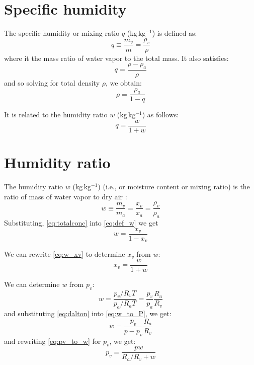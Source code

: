 \section*{Specific humidity}

The specific humidity or mixing ratio $q$ (kg\,kg$^{-1}$) is defined as:
\begin{equation}
q \equiv \frac{m_v}{m} = \frac{\rho_v}{\rho}
\label{eq:def_q}
\end{equation}
where it the mass ratio of water vapor to the total mass. It also satisfies:
\begin{equation}
q = \frac{\rho - \rho_a}{\rho}
\label{eq:q_rho}
\end{equation}
and so solving for total density $\rho$, we obtain:
\begin{equation}
\rho = \frac{\rho_a}{1-q}
\label{eq:q_rho2}
\end{equation}

It is related to the humidity ratio $w$ (kg\,kg$^{-1}$) as follows:
\begin{equation}
q = \frac{w}{1 + w}
\label{eq:q_w}
\end{equation}

\section*{Humidity ratio}

The humidity ratio $w$ (kg\,kg$^{-1}$) (i.e., or moisture content or mixing ratio) is the ratio of mass of water vapor to dry air \citep{ASHRAE2013}:
\begin{equation}
w \equiv \frac{m_v}{m_a} = \frac{x_v}{x_a} = \frac{\rho_v}{\rho_a}
\label{eq:def_w}
\end{equation}
Substituting, \cref{eq:totalconc} into \cref{eq:def_w} we get
\begin{equation}
w = \frac{x_v}{1 - x_v}
\label{eq:w_xv}
\end{equation}

We can rewrite \cref{eq:w_xv} to determine $x_v$ from $w$:
\begin{equation}
x_v = \frac{w}{1 + w}
\label{eq:xv_w}
\end{equation}

We can determine $w$ from $p_v$:
\begin{equation}
w = \frac{p_v/R_v T}{p_a/ R_aT} = \frac{p_v}{p_a}\frac{R_a}{R_v}
\label{eq:w_to_P}
\end{equation}
and substituting \cref{eq:dalton} into \cref{eq:w_to_P}, we get:
\begin{equation}
w = \frac{p_v}{p-p_v}\frac{R_a}{R_v}
\label{eq:pv_to_w}
\end{equation}
and rewriting \ref{eq:pv_to_w} for $p_v$, we get:
\begin{equation}
p_v = \frac{p w}{R_a/R_v+w}
\label{eq:w_to_pv}
\end{equation}

